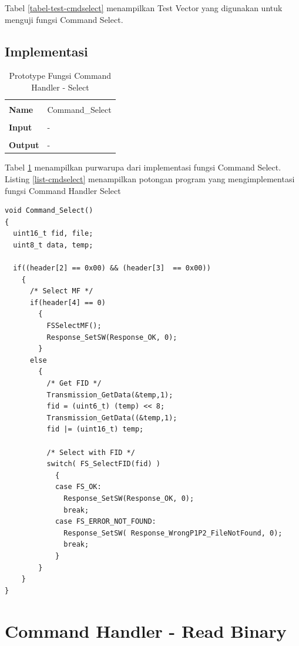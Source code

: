Tabel \ref{tabel-test-cmdselect} menampilkan Test Vector yang digunakan untuk menguji fungsi Command Select.

\subsection {Implementasi}

\begin{table}[h]
  \centering
  \begin{tabular}{m{2cm} p{8cm}}
    \hline\\
    {\bf Name} & Command\_Select\\
    \hline\\
    {\bf Input} & -
    \\
    \hline\\
    {\bf Output} & -
    \\
    \hline
  \end{tabular}
  \caption{Prototype Fungsi Command Handler - Select}
  \label{tabel-cmdselect}
\end{table}

Tabel \ref{tabel-cmdselect} menampilkan purwarupa dari implementasi fungsi Command Select. 
Listing \ref{list-cmdselect} menampilkan potongan program yang mengimplementasi fungsi Command Handler Select

\begin{lstlisting}[caption={Listing Program Fungsi Command Handler Select}, label={list-cmdselect}]
void Command_Select()
{
  uint16_t fid, file;
  uint8_t data, temp;

  if((header[2] == 0x00) && (header[3]  == 0x00))
    {
      /* Select MF */
      if(header[4] == 0)
        {
          FSSelectMF();
          Response_SetSW(Response_OK, 0);
        }
      else
        {
          /* Get FID */
          Transmission_GetData(&temp,1);
          fid = (uint6_t) (temp) << 8;
          Transmission_GetData((&temp,1);
          fid |= (uint16_t) temp;

          /* Select with FID */
          switch( FS_SelectFID(fid) )
            {
            case FS_OK:
              Response_SetSW(Response_OK, 0);
              break;
            case FS_ERROR_NOT_FOUND:
              Response_SetSW( Response_WrongP1P2_FileNotFound, 0);
              break;              
            }
        }
    }
}
\end{lstlisting}


\section{Command Handler - Read Binary}
\label{sec_cmdread}

